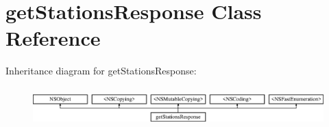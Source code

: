 \hypertarget{interfaceget_stations_response}{}\section{get\+Stations\+Response Class Reference}
\label{interfaceget_stations_response}
Inheritance diagram for get\+Stations\+Response\+:\begin{figure}[H]
\begin{center}
\leavevmode
\includegraphics[height=1.544828cm]{interfaceget_stations_response}
\end{center}
\end{figure}
